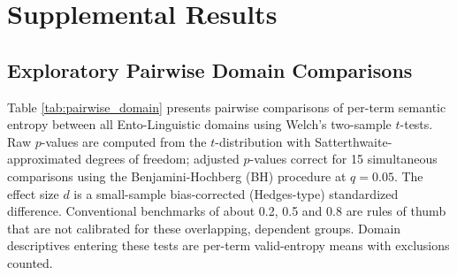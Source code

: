 \documentclass[
]{article}
\numberwithin{equation}{section}
\begin{document}
\clearpage

\section{Supplemental Results}\label{sec:supplemental_results}

\subsection{Exploratory Pairwise Domain
Comparisons}\label{exploratory-pairwise-domain-comparisons}

Table \ref{tab:pairwise_domain} presents pairwise comparisons of
per-term semantic entropy between all Ento-Linguistic domains using
Welch's two-sample \(t\)-tests. Raw \(p\)-values are computed from the
\(t\)-distribution with Satterthwaite-approximated degrees of freedom;
adjusted \(p\)-values correct for 15 simultaneous comparisons using the
Benjamini-Hochberg (BH) procedure at \(q = 0.05\). The effect size \(d\)
is a small-sample bias-corrected (Hedges-type) standardized difference.
Conventional benchmarks of about 0.2, 0.5 and 0.8
\citep{cohen1988statistical} are rules of thumb that are not calibrated
for these overlapping, dependent groups. Domain descriptives entering
these tests are per-term valid-entropy means with exclusions counted.
\end{document}

